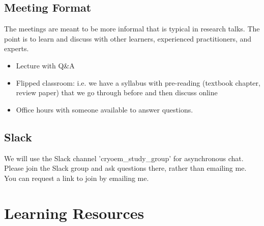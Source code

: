 \documentclass[11pt, oneside]{article}   	%
\begin{document}
\subsection{Meeting Format}
The meetings are meant to be more informal that is typical in research talks. The point is to learn and discuss with other learners, experienced practitioners, and experts.
\begin{itemize}
	\item Lecture with Q\&A
	\item Flipped classroom: i.e. we have a syllabus with pre-reading (textbook chapter, review paper) that we go through before and then discuss online
	\item Office hours with someone available to answer questions.
\end{itemize}

\subsection{Slack}
We will use the Slack channel 'cryoem\_study\_group' for asynchronous chat. Please join the Slack group and ask questions there, rather than emailing me. You can request a link to join by emailing me.

\section{Learning Resources}
\end{document}
